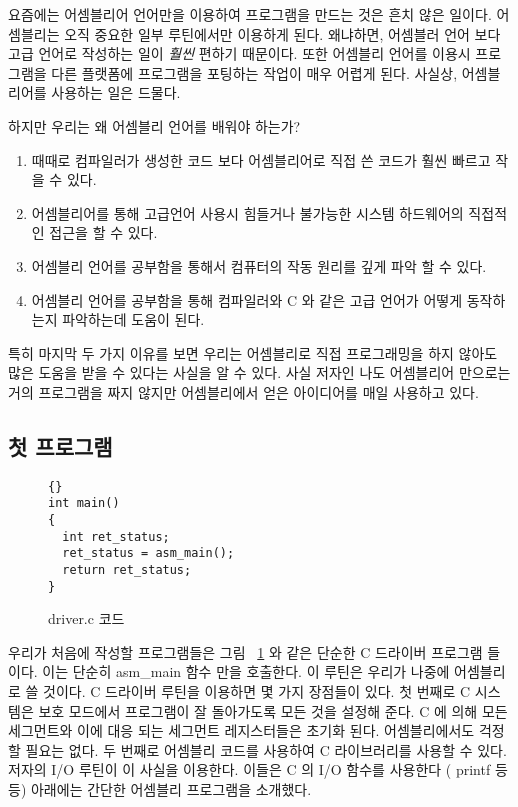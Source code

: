 요즘에는 어셈블리어 언어만을 이용하여 프로그램을 만드는 것은 흔치 않은 일이다. 어셈블리는 오직 중요한 일부 루틴에서만 이용하게 된다. 왜냐하면, 어셈블러
언어 보다 고급 언어로 작성하는 일이 \emph{훨씬} 편하기 때문이다. 또한 어셈블리 언어를 이용시 프로그램을 다른 플랫폼에 프로그램을 포팅하는 작업이 매우
어렵게 된다. 사실상, 어셈블리어를 사용하는 일은 드물다. 

하지만 우리는 왜 어셈블리 언어를 배워야 하는가?

\begin{enumerate}
\item 때때로 컴파일러가 생성한 코드 보다 어셈블리어로 직접 쓴 코드가 훨씬 
      빠르고 작을 수 있다. 
\item 어셈블리어를 통해 고급언어 사용시 힘들거나 불가능한 시스템 하드웨어의
      직접적인 접근을 할 수 있다. 
\item 어셈블리 언어를 공부함을 통해서 컴퓨터의 작동 원리를 깊게 파악 할 수 있다. 
      
\item 어셈블리 언어를 공부함을 통해 컴파일러와 C 와 같은 고급 언어가 어떻게
      동작하는지 파악하는데 도움이 된다.
\end{enumerate}
특히 마지막 두 가지 이유를 보면 우리는 어셈블리로 직접 프로그래밍을 하지 않아도 많은 도움을 받을 수 있다는 사실을 알 수 있다. 사실 저자인 나도 어셈블리어
만으로는 거의 프로그램을 짜지 않지만 어셈블리에서 얻은 아이디어를 매일 사용하고 있다. 

\subsection{첫 프로그램}

\begin{figure}[t]
\begin{lstlisting}[frame=tlrb]{}
int main()
{
  int ret_status;
  ret_status = asm_main();
  return ret_status;
}
\end{lstlisting}
\caption{{\code driver.c} 코드\label{fig:driverProg} }
\end{figure}
우리가 처음에 작성할 프로그램들은 그림 ~\ref{fig:driverProg} 와 같은 단순한 C 드라이버 프로그램 들이다. 이는 단순히 {\code asm\_main}  함수
만을 호출한다. 이 루틴은 우리가 나중에 어셈블리로 쓸 것이다. C 드라이버 루틴을 이용하면 몇 가지 장점들이 있다. 첫 번째로 C 시스템은 보호 모드에서 프로그램이
잘 돌아가도록 모든 것을 설정해 준다. C 에 의해 모든 세그먼트와 이에 대응 되는 세그먼트 레지스터들은 초기화 된다. 어셈블리에서도 걱정할 필요는
없다. 두 번째로 어셈블리 코드를 사용하여 C 라이브러리를 사용할 수 있다. 저자의 I/O 루틴이 이 사실을 이용한다. 이들은 C 의 I/O 함수를 사용한다 (
{\code printf} 등등) 아래에는 간단한 어셈블리 프로그램을 소개했다. 


